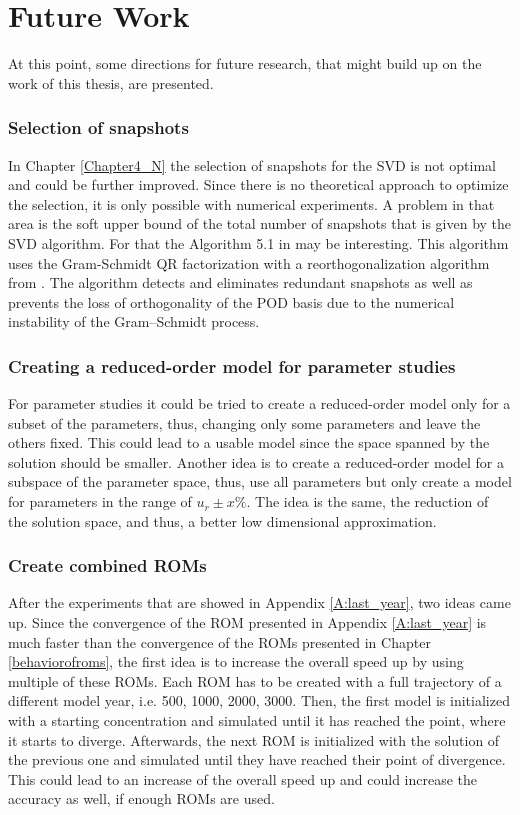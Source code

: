 \section{Future Work}
At this point, some directions for future research, that might build
up on the work of this thesis, are presented. 

\subsubsection*{Selection of snapshots}


In Chapter \ref{Chapter4_N} the selection of snapshots for the SVD is not optimal and could be further improved.
Since there is no theoretical approach to optimize the selection, it is only possible with numerical experiments.
A problem in that area is the soft upper bound of the total number of snapshots that is given by the SVD algorithm.
For that the Algorithm 5.1 in \cite{PODDeimapplication} may be interesting.
This algorithm uses the Gram-Schmidt QR factorization with a reorthogonalization algorithm from \cite{Daniel2007ReorthogonalizationAS}.
The algorithm detects and eliminates redundant snapshots as well as prevents the loss of orthogonality of the POD basis due to the numerical instability of the Gram–Schmidt process.


\subsubsection*{Creating a reduced-order model for parameter studies}
For parameter studies it could be tried to create a reduced-order model only for a subset of the parameters, thus, changing only some parameters and leave the others fixed.
This could lead to a usable model since the space spanned by the solution should be smaller. Another idea is to create a reduced-order model for a subspace of the parameter space, thus, use all parameters but only create a model for 
parameters in the range of $u_r \pm x\%$. The idea is the same, the reduction of the solution space, and thus, a better low dimensional approximation. 

\subsubsection*{Create combined ROMs}
After the experiments that are showed in Appendix \ref{A:last_year}, two ideas came up. 
Since the convergence of the ROM presented in Appendix \ref{A:last_year} is much faster than the convergence 
of the ROMs presented in Chapter \ref{behaviorofroms}, the first idea is to increase the overall speed up by using 
multiple of these ROMs. Each ROM has to be created with a  full trajectory of a different  model year, i.e. 500, 1000, 2000, 3000. 
Then, the first model is initialized with a starting concentration and simulated until it has reached the point, where
it starts to diverge. Afterwards, the next ROM is initialized with the solution of the previous one and simulated until 
they have reached their point of divergence. This could lead to an increase of the overall speed up and could increase the accuracy
as well, if enough ROMs are used. 

